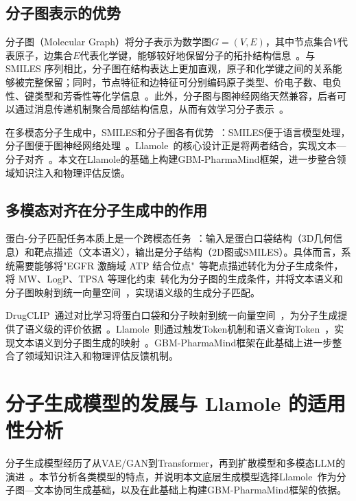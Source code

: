 \subsection{分子图表示的优势}

分子图（Molecular Graph）将分子表示为数学图$G = (V, E)$，其中节点集合$V$代表原子，边集合$E$代表化学键，能够较好地保留分子的拓扑结构信息~\cite{Xu2019}。与 SMILES 序列相比，分子图在结构表达上更加直观，原子和化学键之间的关系能够被完整保留；同时，节点特征和边特征可分别编码原子类型、价电子数、电负性、键类型和芳香性等化学信息~\cite{Gilmer2017}。此外，分子图与图神经网络天然兼容，后者可以通过消息传递机制聚合局部结构信息，从而有效学习分子表示~\cite{Xu2019,Gilmer2017}。

在多模态分子生成中，SMILES和分子图各有优势~\cite{liu2025multimodal}：SMILES便于语言模型处理，分子图便于图神经网络处理~\cite{liu2025multimodal}。Llamole~\cite{liu2025multimodal}的核心设计正是将两者结合，实现文本—分子对齐~\cite{liu2025multimodal}。本文在Llamole的基础上构建GBM-PharmaMind框架，进一步整合领域知识注入和物理评估反馈。

\subsection{多模态对齐在分子生成中的作用}

蛋白-分子匹配任务本质上是一个跨模态任务~\cite{Gao2023}：输入是蛋白口袋结构（3D几何信息）和靶点描述（文本语义），输出是分子结构（2D图或SMILES）。具体而言，系统需要能够将"EGFR 激酶域 ATP 结合位点"~\cite{Fu2025}等靶点描述转化为分子生成条件，将 MW、LogP、TPSA 等理化约束~\cite{Ertl2000,Pardridge2012}转化为分子图的生成条件，并将文本语义和分子图映射到统一向量空间~\cite{Gao2023}，实现语义级的生成分子匹配。

DrugCLIP~\cite{Gao2023}通过对比学习将蛋白口袋和分子映射到统一向量空间~\cite{Gao2023}，为分子生成提供了语义级的评价依据~\cite{Gao2023}。Llamole~\cite{liu2025multimodal}则通过触发Token机制和语义查询Token~\cite{liu2025multimodal}，实现文本语义到分子图生成的映射~\cite{liu2025multimodal}。GBM-PharmaMind框架在此基础上进一步整合了领域知识注入和物理评估反馈机制。

\section{分子生成模型的发展与 Llamole 的适用性分析}\label{sec:generation-models}

分子生成模型经历了从VAE/GAN到Transformer，再到扩散模型和多模态LLM的演进~\cite{Grisoni2023}。本节分析各类模型的特点，并说明本文底层生成模型选择Llamole~\cite{liu2025multimodal}作为分子图—文本协同生成基础，以及在此基础上构建GBM-PharmaMind框架的依据。


